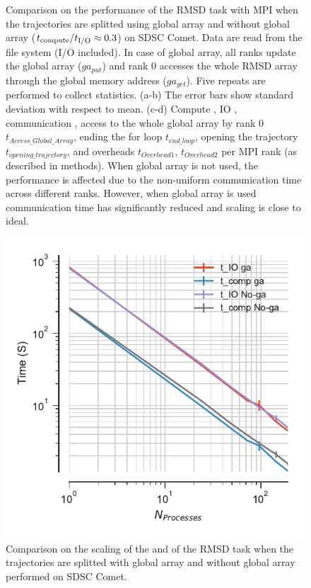 \begin{figure}[ht!]
\caption{Comparison on the performance of the RMSD task with MPI when the trajectories are splitted using global array and without global array (${t}_{\text{compute}}/{t}_{\text{I/O}} \approx 0.3$) on SDSC Comet.
Data are read from the file system (I/O included). In case of global array, all ranks update the global array ($ga_{put}$) and rank 0 accesses the whole RMSD array through the global memory address ($ga_{get}$).
Five repeats are performed to collect statistics. (a-b) The error bars show standard deviation with respect to mean. 
(c-d) Compute \tcomp, IO \tIO, communication \tcomm, access to the whole global array by rank 0 $t_{Access\_Global\_Array}$, ending the for loop $t_{end\_loop}$, 
opening the trajectory $t_{opening\_trajectory}$, and overheads $t_{Overhead1}$, $t_{Overhead2}$ per MPI rank (as described in methods). When global array is not used, the performance is affected due to the non-uniform
communication time across different ranks. However, when global array is used communication time has significantly reduced and scaling is close to ideal.}
\label{fig:MPIwithIO-split}
\end{figure}

\begin{figure}[ht!]
\centering
  \includegraphics[width=0.4\linewidth]{figures/Comparison_IO_compute_scaling_traj_splitting.pdf}
\caption{Comparison on the scaling of the \tcomp and \tIO of the RMSD task when the trajectories are splitted with global array and without global array performed on SDSC Comet.}
\label{fig:ScalingComputeIO-split}
\end{figure}

